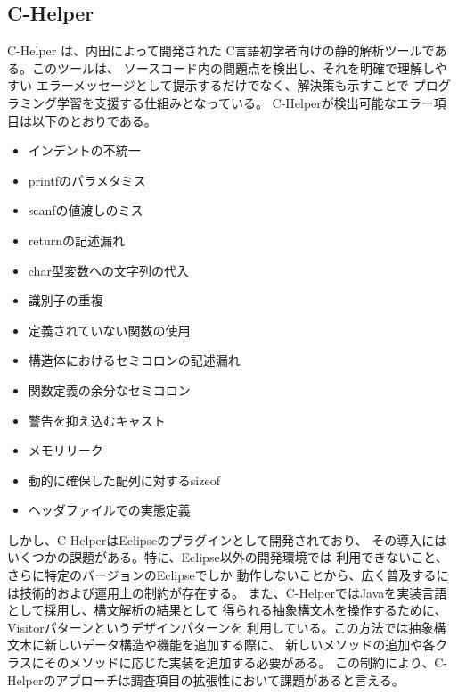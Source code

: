 \documentclass{cssspaper}
\begin{document}
            \subsection{C-Helper}
            C-Helper \cite{1,2,3}は、内田によって開発された
            C言語初学者向けの静的解析ツールである。このツールは、
            ソースコード内の問題点を検出し、それを明確で理解しやすい
            エラーメッセージとして提示するだけでなく、解決策も示すことで
            プログラミング学習を支援する仕組みとなっている。
            C-Helperが検出可能なエラー項目は以下のとおりである。
            \begin{itemize}
                \item インデントの不統一
                \item printfのパラメタミス
                \item scanfの値渡しのミス
                \item returnの記述漏れ
                \item char型変数への文字列の代入
                \item 識別子の重複
                \item 定義されていない関数の使用
                \item 構造体におけるセミコロンの記述漏れ
                \item 関数定義の余分なセミコロン
                \item 警告を抑え込むキャスト
                \item メモリリーク
                \item 動的に確保した配列に対するsizeof
                \item ヘッダファイルでの実態定義
            \end{itemize}
            しかし、C-HelperはEclipseのプラグインとして開発されており、
            その導入にはいくつかの課題がある。特に、Eclipse以外の開発環境では
            利用できないこと、さらに特定のバージョンのEclipseでしか
            動作しないことから、広く普及するには技術的および運用上の制約が存在する。
            また、C-HelperではJavaを実装言語として採用し、構文解析の結果として
            得られる抽象構文木を操作するために、Visitorパターンというデザインパターンを
            利用している。この方法では抽象構文木に新しいデータ構造や機能を追加する際に、
            新しいメソッドの追加や各クラスにそのメソッドに応じた実装を追加する必要がある。
            この制約により、C-Helperのアプローチは調査項目の拡張性において課題があると言える。
\end{document}
